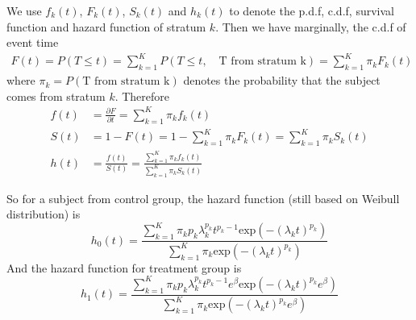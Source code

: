 \documentclass[a4paper,12pt]{article}
\begin{document}
We use $f_k\left(t\right)$, $F_k\left(t\right)$, $S_k\left(t\right)$ and $h_k\left(t\right)$ to denote the p.d.f, c.d.f, survival function and hazard function of stratum $k$. Then we have marginally, the c.d.f of event time
\[
  \begin{aligned}
    F\left(t\right) = P\left(T \leq t\right)
    = \sum\limits_{k = 1}^K P\left(T \leq t,\quad \text{T from stratum k}\right)
    = \sum\limits_{k = 1}^K \pi_k F_k\left(t\right)
  \end{aligned}
\]
where $\pi_k = P\left(\text{T from stratum k}\right)$ denotes the probability that the subject comes from stratum $k$. Therefore
\[
  \begin{aligned}
    f\left(t\right)
    &= \frac{\partial F}{\partial t} = \sum\limits_{k = 1}^K\pi_kf_k\left(t\right)    \\
    S\left(t\right)
    &= 1 - F\left(t\right) = 1 - \sum\limits_{k = 1}^K\pi_kF_k\left(t\right)
      = \sum\limits_{k = 1}^K\pi_k S_k\left(t\right)    \\
    h\left(t\right)
    &= \frac{f\left(t\right)}{S\left(t\right)}
      = \frac{\sum\limits_{k = 1}^K\pi_kf_k\left(t\right)}{\sum\limits_{k = 1}^K\pi_k S_k\left(t\right)}
  \end{aligned}
\]

So for a subject from control group, the hazard function (still based on Weibull distribution) is
\begin{equation}
  \label{eq:control_marginal_hazard}
  h_0\left(t\right) =
  \frac{
    \sum\limits_{k = 1}^K\pi_k
    p_k\lambda_k^{p_k}t^{p_k - 1}
    \mathrm{exp}\left(-\left(\lambda_kt\right)^{p_k}\right)
  }{
    \sum\limits_{k = 1}^K\pi_k
    \mathrm{exp}\left(-\left(\lambda_kt\right)^{p_k}\right)
  }
\end{equation}
And the hazard function for treatment group is
\begin{equation}
  \label{eq:treatment_marginal_hazard}
  h_1\left(t\right) =
  \frac{
    \sum\limits_{k = 1}^K\pi_k
    p_k\lambda_k^{p_k}t^{p_k - 1}e^\beta
    \mathrm{exp}\left(-\left(\lambda_kt\right)^{p_k}e^\beta\right)
  }{
    \sum\limits_{k = 1}^K\pi_k
    \mathrm{exp}\left(-\left(\lambda_kt\right)^{p_k}e^\beta\right)
  }
\end{equation}
\end{document}
